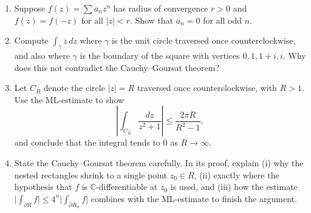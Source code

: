 \documentclass[12pt, reqno]{amsart}
\theoremstyle{definition}
\numberwithin{equation}{subsection}
\newcommand{\C}{\mathbb{C}}
\newcommand{\ov}[1]{\overline{#1}}
\begin{document}
\begin{enumerate}[leftmargin=*]
\item Suppose $f(z)=\sum a_nz^n$ has radius of convergence $r>0$ and $f(z)=f(-z)$ for all $|z|<r$. Show that $a_n=0$ for all odd $n$.

\item Compute $\displaystyle\int_\gamma \ov z\,dz$ where $\gamma$ is the unit circle traversed once counterclockwise, and also
      where $\gamma$ is the boundary of the square with vertices $0,1,1+i,i$. Why does this not contradict the Cauchy--Goursat theorem?

\item Let $C_R$ denote the circle $|z|=R$ traversed once counterclockwise, with $R>1$. Use the ML-estimate to show
\[
\left|\int_{C_R}\frac{dz}{z^2+1}\right|\le\frac{2\pi R}{R^2-1},
\]
and conclude that the integral tends to $0$ as $R\to\infty$.

\item State the Cauchy--Goursat theorem carefully. In its proof, explain (i) why the nested rectangles shrink to a single point
      $z_0\in R$, (ii) exactly where the hypothesis that $f$ is $\C$-differentiable at $z_0$ is used, and (iii) how the
      estimate $\bigl|\int_{\partial R}f\bigr|\le 4^n\bigl|\int_{\partial R_n}f\bigr|$ combines with the ML-estimate to finish the argument.

\end{enumerate}
\end{document}
